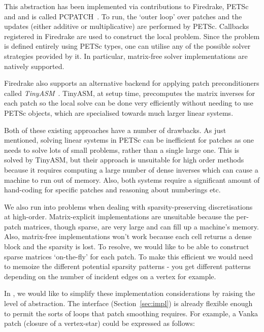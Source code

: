 This abstraction has been implemented via contributions to Firedrake, PETSc and  and is called PCPATCH~\cite{farrellPCPATCHSoftwareTopological2021}.
To run, the `outer loop' over patches and the updates (either additive or multiplicative) are performed by PETSc.
Callbacks registered in Firedrake are used to construct the local problem.
Since the problem is defined entirely using PETSc types, one can utilise any of the possible solver strategies provided by it.
In particular, matrix-free solver implementations are natively supported.

Firedrake also supports an alternative backend for applying patch preconditioners called \textit{TinyASM}~\cite{wechsungTinyASMBlockJacobiImplementation}.
TinyASM, at setup time, precomputes the matrix inverses for each patch so the local solve can be done very efficiently without needing to use PETSc objects, which are specialised towards much larger linear systems.

Both of these existing approaches have a number of drawbacks.
As just mentioned, solving linear systems in PETSc can be inefficient for patches as one needs to solve lots of small problems, rather than a single large one.
This is solved by TinyASM, but their approach is unsuitable for high order methods because it requires computing a large number of dense inverses which can cause a machine to run out of memory.
Also, both systems require a significant amount of hand-coding for specific patches and reasoning about numberings etc.

We also run into problems when dealing with sparsity-preserving discretisations at high-order.
Matrix-explicit implementations are unsuitable because the per-patch matrices, though sparse, are very large and can fill up a machine's memory.
Also, matrix-free implementations won't work because each cell returns a dense block and the sparsity is lost.
To resolve, we would like to be able to construct sparse matrices `on-the-fly' for each patch.
To make this efficient we would need to memoize the different potential sparsity patterns - you get different patterns depending on the number of incident edges on a vertex for example.

In , we would like to simplify these implementation considerations by raising the level of abstraction.
The  interface (Section~\ref{sec:impl}) is already flexible enough to permit the sorts of loops that patch smoothing requires.
For example, a Vanka patch (closure of a vertex-star) could be expressed as follows:


